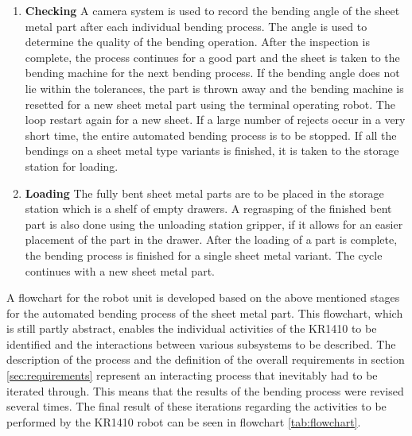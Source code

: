 \begin{enumerate}
    \item \par{\textbf{Checking}}
    \label{par:checking}
    A camera system is used to record the bending angle of the sheet metal part after each individual
    bending process. The angle is used to determine the quality of the bending operation. After the inspection is complete, the process continues  for a good part and the sheet is taken to the bending machine for the next bending process. If the bending angle does not lie within the tolerances, the part is thrown away and the bending machine is resetted for a new sheet metal part using the terminal operating robot. The loop restart again for a new sheet. If a large number of rejects occur in a very short time, the entire automated bending process is to be stopped.
    If all the bendings on a sheet metal type variants is finished, it is taken to the storage station for loading.
    
    \item \par{\textbf{Loading}}
    \label{par:loading}
    The fully bent sheet metal parts are to be placed in the storage station which is a shelf of empty drawers. A regrasping of the finished bent part is also done using the unloading station gripper, if it allows for an easier placement of the part in the drawer. After the loading of a part is complete, the bending process is finished for a single sheet metal variant. The cycle continues with a new sheet metal part.
    
\end{enumerate}

\vspace{1\baselineskip}
A flowchart for the robot unit is developed based on the above mentioned stages for the automated bending process of the sheet metal part. This
flowchart, which is still partly abstract, enables the individual activities of the KR1410 to be identified and
the interactions between various subsystems to be described. The description of the process and the definition of the overall requirements in section \ref{sec:requirements} represent an interacting process that inevitably had to be iterated through. This means that the results
of the bending process were revised several times. The final result of these iterations regarding the
activities to be performed by the KR1410 robot can be seen in flowchart \ref{tab:flowchart}. 

